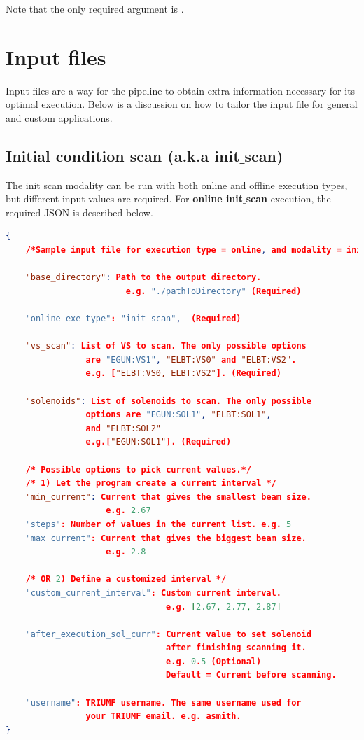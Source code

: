 \documentclass{article}
\begin{document}
Note that the only required argument is . 

\newpage
\section{Input files} \label{appendix:input_files}
Input files are a way for the pipeline to obtain extra information necessary for its optimal execution. Below is a discussion on how to tailor the input file for general and custom applications.  
\subsection{Initial condition scan (a.k.a init$\_$scan)}
The init$\_$scan modality can be run with both online and offline execution types, but different input values are required. For \textbf{online init$\_$scan} execution, the required JSON is described below. 
\begin{lstlisting}[language=json,firstnumber=0]
{
    /*Sample input file for execution type = online, and modality = init_scan */

    "base_directory": Path to the output directory.
                        e.g. "./pathToDirectory" (Required)
    
    "online_exe_type": "init_scan",  (Required)
    
    "vs_scan": List of VS to scan. The only possible options
                are "EGUN:VS1", "ELBT:VS0" and "ELBT:VS2".
                e.g. ["ELBT:VS0, ELBT:VS2"]. (Required)
    
    "solenoids": List of solenoids to scan. The only possible 
                options are "EGUN:SOL1", "ELBT:SOL1", 
                and "ELBT:SOL2" 
                e.g.["EGUN:SOL1"]. (Required)

    /* Possible options to pick current values.*/
    /* 1) Let the program create a current interval */
    "min_current": Current that gives the smallest beam size. 
                    e.g. 2.67
    "steps": Number of values in the current list. e.g. 5
    "max_current": Current that gives the biggest beam size.
                    e.g. 2.8
    
    /* OR 2) Define a customized interval */
    "custom_current_interval": Custom current interval.
                                e.g. [2.67, 2.77, 2.87] 

    "after_execution_sol_curr": Current value to set solenoid 
                                after finishing scanning it. 
                                e.g. 0.5 (Optional) 
                                Default = Current before scanning.
    
    "username": TRIUMF username. The same username used for 
                your TRIUMF email. e.g. asmith.
}
\end{lstlisting}
\end{document}
